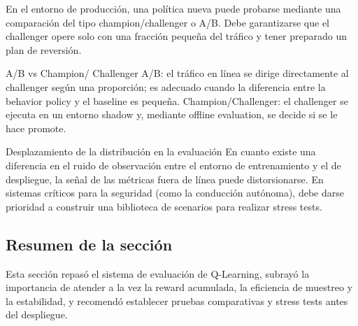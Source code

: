 En el entorno de producción, una política nueva puede probarse mediante una comparación del tipo champion/challenger o A/B. Debe garantizarse que el challenger opere solo con una fracción pequeña del tráfico y tener preparado un plan de reversión.

\begin{knowledgebox}{A/B vs Champion/ Challenger}
A/B: el tráfico en línea se dirige directamente al challenger según una proporción; es adecuado cuando la diferencia entre la behavior policy y el baseline es pequeña. Champion/Challenger: el challenger se ejecuta en un entorno shadow y, mediante offline evaluation, se decide si se le hace promote.
\end{knowledgebox}

\begin{warningbox}{Desplazamiento de la distribución en la evaluación}
En cuanto existe una diferencia en el ruido de observación entre el entorno de entrenamiento y el de despliegue, la señal de las métricas fuera de línea puede distorsionarse. En sistemas críticos para la seguridad (como la conducción autónoma), debe darse prioridad a construir una biblioteca de scenarios para realizar stress tests.
\end{warningbox}

\subsection{Resumen de la sección}

Esta sección repasó el sistema de evaluación de Q-Learning, subrayó la importancia de atender a la vez la reward acumulada, la eficiencia de muestreo y la estabilidad, y recomendó establecer pruebas comparativas y stress tests antes del despliegue.
